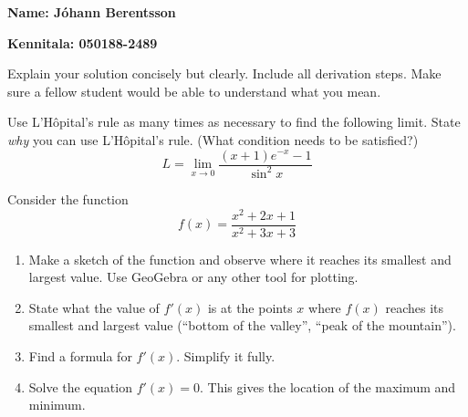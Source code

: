 \documentclass[answers,a4paper,11pt]{exam}
\begin{document}
\noindent
\textbf{Name: Jóhann Berentsson} %

\vspace{0.5em}
\noindent
\textbf{Kennitala: 050188-2489} %

\vspace{0.5em}
\noindent
Explain your solution concisely but clearly. Include all derivation steps. Make sure a fellow student would be able to understand what you mean.

\begin{questions}

\question
Use L'H\^opital's rule as many times as necessary to find the following limit. State \emph{why} you can use L'H\^opital's rule. (What condition needs to be satisfied?)
\[
L = \lim_{x\to 0} \frac{(x+1) e^{-x} - 1}{\sin^2 x}
\]
    

    
\newpage

\question
Consider the function
\[
f(x) = \frac{x^2+2 x+1}{x^2+3 x+3}
\]
\begin{enumerate}
\item Make a sketch of the function and observe where it reaches its smallest and largest value. Use GeoGebra or any other tool for plotting.
\item State what the value of $f'(x)$ is at the points $x$ where $f(x)$ reaches its smallest and largest value (``bottom of the valley'', ``peak of the mountain'').
\item Find a formula for $f'(x)$. Simplify it fully.
\item Solve the equation $f'(x) = 0$. This gives the location of the maximum and minimum.
\end{enumerate}



\end{questions}        
\end{document}
